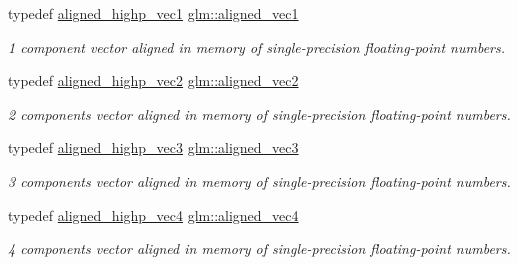 \begin{DoxyCompactItemize}
typedef \hyperlink{group__gtc__type__aligned_ga8da7535c1fe488b2b9a29c0c05e7b17e}{aligned\+\_\+highp\+\_\+vec1} \hyperlink{group__gtc__type__aligned_ga8cf75c112dfa39264b7ef65c2ed6b3c4}{glm\+::aligned\+\_\+vec1}
\begin{DoxyCompactList}\small\item\em 1 component vector aligned in memory of single-\/precision floating-\/point numbers. \end{DoxyCompactList}\item 
\mbox{\label{group__gtc__type__aligned_ga8f4a38f220c72d218dbdc7bc1d06a1a2}} 
typedef \hyperlink{group__gtc__type__aligned_ga7467c1a16f31911de3b927338434af6d}{aligned\+\_\+highp\+\_\+vec2} \hyperlink{group__gtc__type__aligned_ga8f4a38f220c72d218dbdc7bc1d06a1a2}{glm\+::aligned\+\_\+vec2}
\begin{DoxyCompactList}\small\item\em 2 components vector aligned in memory of single-\/precision floating-\/point numbers. \end{DoxyCompactList}\item 
\mbox{\label{group__gtc__type__aligned_ga9c54536a3becfd10a44f6b1b8c4aa3d3}} 
typedef \hyperlink{group__gtc__type__aligned_ga9ddb18aa4936b5aa354fcefe179675af}{aligned\+\_\+highp\+\_\+vec3} \hyperlink{group__gtc__type__aligned_ga9c54536a3becfd10a44f6b1b8c4aa3d3}{glm\+::aligned\+\_\+vec3}
\begin{DoxyCompactList}\small\item\em 3 components vector aligned in memory of single-\/precision floating-\/point numbers. \end{DoxyCompactList}\item 
\mbox{\label{group__gtc__type__aligned_gad26d520694d7b865507819c2d9f2b196}} 
typedef \hyperlink{group__gtc__type__aligned_ga60d6561b0daa150c617f3a7a277e44ee}{aligned\+\_\+highp\+\_\+vec4} \hyperlink{group__gtc__type__aligned_gad26d520694d7b865507819c2d9f2b196}{glm\+::aligned\+\_\+vec4}
\begin{DoxyCompactList}\small\item\em 4 components vector aligned in memory of single-\/precision floating-\/point numbers. \end{DoxyCompactList}\item 
\mbox{\label{group__gtc__type__aligned_ga1722068e0357aca709e5002f20cc043f}} 

\end{DoxyCompactItemize}

